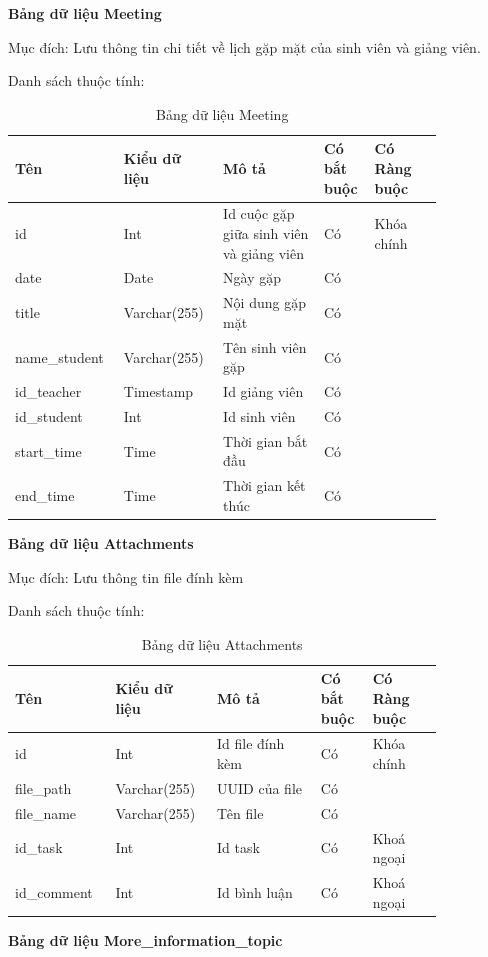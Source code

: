 \documentclass[../Main.tex]{subfiles}
\begin{document}
\textbf{Bảng dữ liệu Meeting}

Mục đích: Lưu thông tin chi tiết về lịch gặp mặt của sinh viên và giảng viên.

Danh sách thuộc tính: 
\begin{table}[H]
\centering
\bgroup
\renewcommand{\arraystretch}{1.5}%
\begin{tabular}{|L{0.2\linewidth}|L{0.18\linewidth}|L{0.22\linewidth}|L{0.1\linewidth}|L{0.15\linewidth}|}
\hline
\textbf{Tên} & \textbf{Kiểu dữ liệu} & \textbf{Mô tả} & \textbf{Có bắt buộc} & \textbf{Có Ràng buộc} \\ \hline
id & Int & Id cuộc gặp giữa sinh viên và giảng viên & Có & Khóa chính \\ \hline
date & Date & Ngày gặp & Có &  \\ \hline
title & Varchar(255) & Nội dung gặp mặt & Có &  \\ \hline
name\_student & Varchar(255) & Tên sinh viên gặp & Có &  \\ \hline
id\_teacher & Timestamp & Id giảng viên & Có &  \\ \hline
id\_student & Int & Id sinh viên & Có &  \\ \hline
start\_time & Time & Thời gian bắt đầu & Có &  \\ \hline
end\_time & Time & Thời gian kết thúc & Có &  \\ \hline
\end{tabular}
\egroup
\caption{Bảng dữ liệu Meeting}
\end{table}

\textbf{Bảng dữ liệu Attachments}

Mục đích: Lưu thông tin file đính kèm

Danh sách thuộc tính:
\begin{table}[H]
\centering
\bgroup
\renewcommand{\arraystretch}{1.5}%
\begin{tabular}{|L{0.2\linewidth}|L{0.18\linewidth}|L{0.22\linewidth}|L{0.1\linewidth}|L{0.15\linewidth}|}
\hline
\textbf{Tên} & \textbf{Kiểu dữ liệu} & \textbf{Mô tả} & \textbf{Có bắt buộc} & \textbf{Có Ràng buộc} \\ \hline
id & Int & Id file đính kèm & Có & Khóa chính \\ \hline
file\_path & Varchar(255) & UUID của file & Có &  \\ \hline
file\_name & Varchar(255) & Tên file & Có &  \\ \hline
id\_task & Int & Id task & Có & Khoá ngoại \\ \hline
id\_comment & Int & Id bình luận & Có & Khoá ngoại \\ \hline
\end{tabular}
\egroup
\caption{Bảng dữ liệu Attachments}
\end{table}
\newpage
\textbf{Bảng dữ liệu More\_information\_topic}
\end{document}
